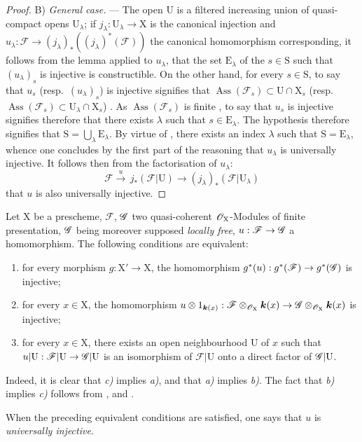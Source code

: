\begin{proof}
B) \emph{General case.} --- The open $\mathrm{U}$ is a filtered increasing union of quasi-compact opens $\mathrm{U}_\lambda$; if $j_\lambda:\mathrm{U}_\lambda\to\mathrm{X}$ is the canonical injection and $u_\lambda:\mathscr{F}\to(j_\lambda)_*((j_\lambda)^*(\mathscr{F}))$ the canonical homomorphism corresponding, it follows from the lemma  applied to $u_\lambda$, that the set $\mathrm{E}_\lambda$ of the $s\in\mathrm{S}$ such that $(u_\lambda)_s$ is injective is constructible.
On the other hand, for every $s\in\mathrm{S}$, to say that $u_s$ (resp.\ $(u_\lambda)_s$) is injective signifies that $\operatorname{Ass}(\mathscr{F}_s)\subset\mathrm{U}\cap\mathrm{X}_s$ (resp.\ $\operatorname{Ass}(\mathscr{F}_s)\subset\mathrm{U}_\lambda\cap\mathrm{X}_s$) .
As $\operatorname{Ass}(\mathscr{F}_s)$ is finite , to say that $u_s$ is injective signifies therefore that there exists $\lambda$ such that $s\in\mathrm{E}_\lambda$.
The hypothesis therefore signifies that $\mathrm{S}=\bigcup_\lambda\mathrm{E}_\lambda$.
By virtue of , there exists an index $\lambda$ such that $\mathrm{S}=\mathrm{E}_\lambda$, whence one concludes by the first part of the reasoning that $u_\lambda$ is universally injective.
It follows then from the factorisation of $u_\lambda$:
\[
  \mathscr{F}\xrightarrow{u}\,j_*(\mathscr{F}|\mathrm{U})\to(j_\lambda)_*(\mathscr{F}|\mathrm{U}_\lambda)
\]
that $u$ is also universally injective.
\end{proof}

\begin{remarks}[11.9.18]
\label{IV.11.9.18}
Let $\mathrm{X}$ be a prescheme, $\mathscr{F}$, $\mathscr{G}$ two quasi-coherent $\mathscr{O}_\mathrm{X}$-Modules of finite presentation, $\mathscr{G}$ being moreover supposed \emph{locally free}, $u:\mathscr{F}\to\mathscr{G}$ a homomorphism.
The following conditions are equivalent:
\begin{enumerate}[label=\emph{\alph*)}]
  \item for every morphism $g:\mathrm{X}'\to\mathrm{X}$, the homomorphism $g^*(u):g^*(\mathscr{F})\to g^*(\mathscr{G})$ is injective;
  \item for every $x\in\mathrm{X}$, the homomorphism $u\otimes 1_{\boldsymbol{k}(x)}:\mathscr{F}\otimes_{\mathscr{O}_{\mathrm{X}}}\boldsymbol{k}(x)\to\mathscr{G}\otimes_{\mathscr{O}_\mathrm{X}}\boldsymbol{k}(x)$ is injective;
  \item for every $x\in\mathrm{X}$, there exists an open neighbourhood $\mathrm{U}$ of $x$ such that $u|\mathrm{U}:\mathscr{F}|\mathrm{U}\to\mathscr{G}|\mathrm{U}$ is an isomorphism of $\mathscr{F}|\mathrm{U}$ onto a direct factor of $\mathscr{G}|\mathrm{U}$.
\end{enumerate}

Indeed, it is clear that \emph{c)} implies \emph{a)}, and that \emph{a)} implies \emph{b)}.
The fact that \emph{b)} implies \emph{c)} follows from ,  and .

When the preceding equivalent conditions are satisfied, one says that $u$ is \emph{universally injective}.
\end{remarks}

